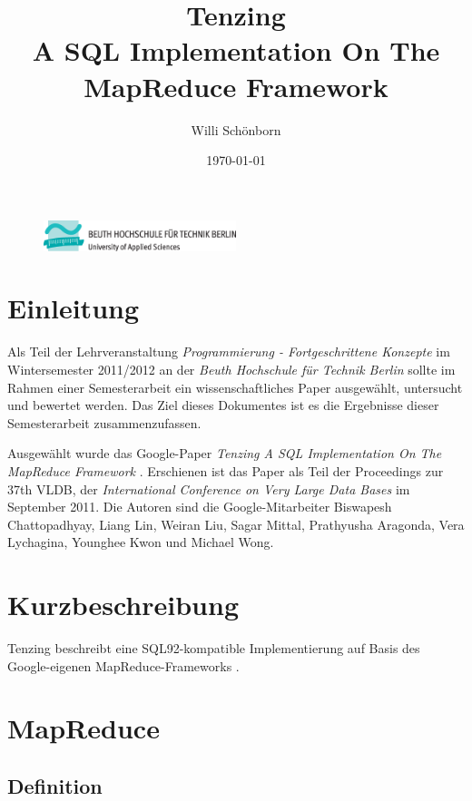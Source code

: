 \documentclass[a4paper]{article}
\title{Tenzing \\ A SQL Implementation On The MapReduce Framework}
\author{Willi Schönborn}
\date{\today}
\begin{document}
\begin{figure}[H]
\centering
\includegraphics[width=0.5\textwidth]{beuth.eps}
\maketitle
\end{figure}

\newpage

\tableofcontents

\newpage

\section{Einleitung}
Als Teil der Lehrveranstaltung \textit{Programmierung - Fortgeschrittene Konzepte} im Wintersemester 2011/2012 an der \textit{Beuth Hochschule für Technik Berlin} sollte im Rahmen einer Semesterarbeit ein wissenschaftliches Paper ausgewählt, untersucht und bewertet werden. Das Ziel dieses Dokumentes ist es die Ergebnisse dieser Semesterarbeit zusammenzufassen.

Ausgewählt wurde das Google-Paper \textit{Tenzing A SQL Implementation On The MapReduce Framework} \cite{TENZING}. Erschienen ist das Paper als Teil der Proceedings zur 37th VLDB, der \textit{International Conference on Very Large Data Bases} im September 2011. Die Autoren sind die Google-Mitarbeiter Biswapesh Chattopadhyay, Liang Lin, Weiran Liu, Sagar Mittal, Prathyusha Aragonda, Vera Lychagina, Younghee Kwon und Michael Wong.

\section{Kurzbeschreibung}
Tenzing beschreibt eine SQL92-kompatible Implementierung auf Basis des Google-eigenen MapReduce-Frameworks \cite{MAPREDUCE}.

\newpage

\section{MapReduce}

\subsection{Definition}
\end{document}
